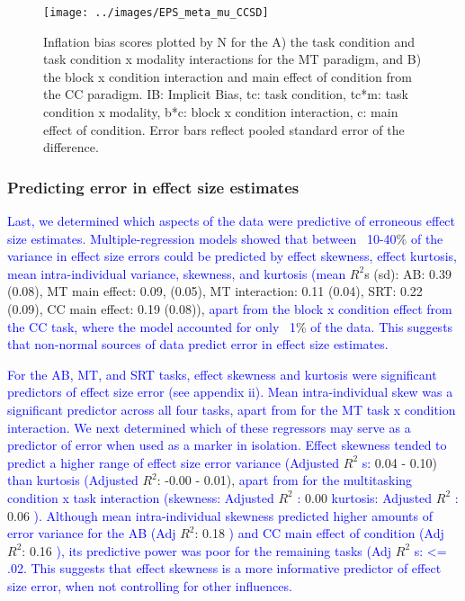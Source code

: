 \documentclass[
  man]{apa6}
\begin{document}
\begin{figure}

{\centering \texttt{[image: ../images/EPS\_meta\_mu\_CCSD]} 

}

\caption{Inflation bias scores plotted by N for the A) the task condition and task condition x modality interactions for the MT paradigm, and B) the block x condition interaction and main effect of condition from the CC paradigm. IB: Implicit Bias, tc: task condition, tc*m: task condition x modality, b*c: block x condition interaction, c: main effect of condition. Error bars reflect pooled standard error of the difference.}\label{fig:infbias}
\end{figure}

\hypertarget{predicting-error-in-effect-size-estimates}{%
\subsubsection{Predicting error in effect size estimates}\label{predicting-error-in-effect-size-estimates}}

\textcolor{blue}{Last, we determined which aspects of the data were predictive of erroneous effect size estimates. Multiple-regression models showed that between ~10-40}\% \textcolor{blue}{of the variance in effect size errors could be predicted by effect skewness, effect kurtosis, mean intra-individual variance, skewness, and kurtosis (mean} \(R^2\)s (sd): AB: 0.39 (0.08), MT main effect: 0.09, (0.05), MT interaction: 0.11 (0.04), SRT: 0.22 (0.09), CC main effect: 0.19 (0.08)), \textcolor{blue}{apart from the block x condition effect from the CC task, where the model accounted for only ~1}\% \textcolor{blue}{of the data. This suggests that non-normal sources of data predict error in effect size estimates.}

\textcolor{blue}{For the AB, MT, and SRT tasks, effect skewness and kurtosis were significant predictors of effect size error (see appendix ii). Mean intra-individual skew was a significant predictor across all four tasks, apart from for the MT task x condition interaction. We next determined which of these regressors may serve as a predictor of error when used as a marker in isolation. Effect skewness tended to predict a higher range of effect size error variance (Adjusted} \(R^2\) \textcolor{blue}{s:} 0.04 - 0.10) \textcolor{blue}{than kurtosis (Adjusted} \(R^2\): -0.00 - 0.01), \textcolor{blue}{apart from for the multitasking condition x task interaction (skewness: Adjusted} \(R^2\) \textcolor{blue}{:} 0.00 \textcolor{blue}{kurtosis: Adjusted} \(R^2\) \textcolor{blue}{:} 0.06 \textcolor{blue}{). Although mean intra-individual skewness predicted higher amounts of error variance for the AB (Adj} \(R^2\): 0.18 \textcolor{blue}{) and CC main effect of condition (Adj} \(R^2\): 0.16 \textcolor{blue}{), its predictive power was poor for the remaining tasks (Adj} \(R^2\) \textcolor{blue}{s: <= .02. This suggests that effect skewness is a more informative predictor of effect size error, when not controlling for other influences.}
\end{document}
